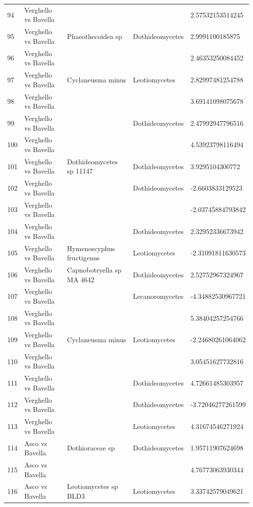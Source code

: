 \documentclass[12pt]{article}\usepackage[]{graphicx}\usepackage[]{color}
\numberwithin{figure}{section}
\begin{document}
\begin{table}[ht]
\begin{tabular}{lllll}
  94 & Verghello vs Bavella &  &  & 2.57532153514245 \\ 
  95 & Verghello vs Bavella & Phaeothecoidea sp & Dothideomycetes & 2.9991100185875 \\ 
  96 & Verghello vs Bavella &  &  & 2.46353250084452 \\ 
  97 & Verghello vs Bavella & Cyclaneusma minus & Leotiomycetes & 2.82997481254788 \\ 
  98 & Verghello vs Bavella &  &  & 3.69141098075678 \\ 
  99 & Verghello vs Bavella &  & Dothideomycetes & 2.47992947796516 \\ 
  100 & Verghello vs Bavella &  &  & 4.53923798116494 \\ 
  101 & Verghello vs Bavella & Dothideomycetes sp 11147 & Dothideomycetes & 3.9295104300772 \\ 
  102 & Verghello vs Bavella &  & Dothideomycetes & -2.6603833129523 \\ 
  103 & Verghello vs Bavella &  &  & -2.03745884793842 \\ 
  104 & Verghello vs Bavella &  & Dothideomycetes & 2.32952336673942 \\ 
  105 & Verghello vs Bavella & Hymenoscyphus fructigenus & Leotiomycetes & -2.31091811630573 \\ 
  106 & Verghello vs Bavella & Capnobotryella sp MA 4642 & Dothideomycetes & 2.52752967324967 \\ 
  107 & Verghello vs Bavella &  & Lecanoromycetes & -4.34882530967721 \\ 
  108 & Verghello vs Bavella &  &  & 5.38404257254766 \\ 
  109 & Verghello vs Bavella & Cyclaneusma minus & Leotiomycetes & -2.24680261064062 \\ 
  110 & Verghello vs Bavella &  &  & 3.05451627732816 \\ 
  111 & Verghello vs Bavella &  & Dothideomycetes & 4.72661485303957 \\ 
  112 & Verghello vs Bavella &  & Dothideomycetes & -3.72046277261599 \\ 
  113 & Verghello vs Bavella &  & Leotiomycetes & 4.31674546271924 \\ 
  114 & Asco vs Bavella & Dothioraceae sp & Dothideomycetes & 1.95711907624698 \\ 
  115 & Asco vs Bavella &  &  & 4.76773063930344 \\ 
  116 & Asco vs Bavella & Leotiomycetes sp BLD3 & Leotiomycetes & 3.33742579049621 \\ 

\end{tabular}
\end{table}
\end{document}
